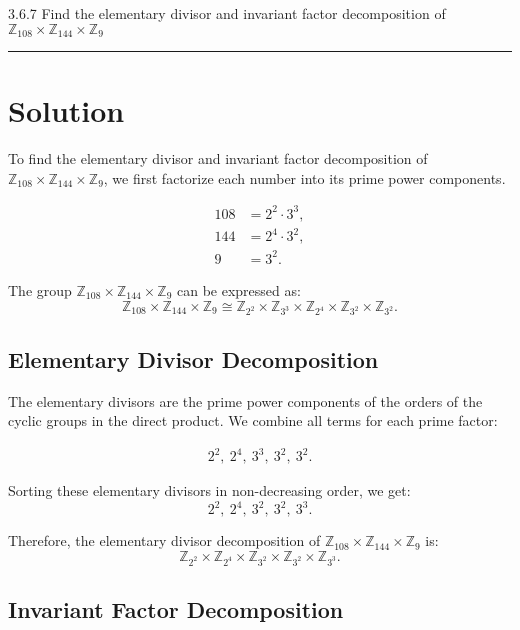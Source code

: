 \documentclass[12pt]{amsart}
\theoremstyle{definition}
\numberwithin{equation}{section}
\newcommand{\Z}{\mathbb{Z}}
\begin{document}
\begin{exercise}{3.6.7} Find the elementary divisor and invariant factor decomposition of \(\Z_{108}\times \Z_{144} \times \Z_9\)

    \noindent\rule{\linewidth}{1pt}
    
    \section*{Solution}

    To find the elementary divisor and invariant factor decomposition of \(\Z_{108} \times \Z_{144} \times \Z_9\), we first factorize each number into its prime power components.

    \begin{align*}
    108 &= 2^2 \cdot 3^3, \\
    144 &= 2^4 \cdot 3^2, \\
    9 &= 3^2.
    \end{align*}

    The group \(\Z_{108} \times \Z_{144} \times \Z_9\) can be expressed as:
    \[
    \Z_{108} \times \Z_{144} \times \Z_9 \cong \Z_{2^2} \times \Z_{3^3} \times \Z_{2^4} \times \Z_{3^2} \times \Z_{3^2}.
    \]

    \subsection*{Elementary Divisor Decomposition}

    The elementary divisors are the prime power components of the orders of the cyclic groups in the direct product. We combine all terms for each prime factor:

    \begin{align*}
    2^2, \ 2^4, \ 3^3, \ 3^2, \ 3^2.
    \end{align*}

    Sorting these elementary divisors in non-decreasing order, we get:
    \[
    2^2, \ 2^4, \ 3^2, \ 3^2, \ 3^3.
    \]

    Therefore, the elementary divisor decomposition of \(\Z_{108} \times \Z_{144} \times \Z_9\) is:
    \[
    \Z_{2^2} \times \Z_{2^4} \times \Z_{3^2} \times \Z_{3^2} \times \Z_{3^3}.
    \]

    \subsection*{Invariant Factor Decomposition}


\end{exercise}
\end{document}
